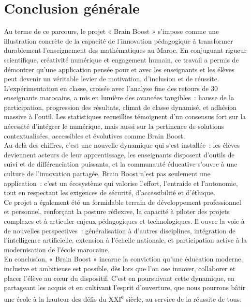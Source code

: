 \documentclass[a4paper,11pt]{report}
\begin{document}
\chapter*{Conclusion générale}

Au terme de ce parcours, le projet « Brain Boost » s'impose comme une illustration concrète de la capacité de l'innovation pédagogique à transformer durablement l'enseignement des mathématiques au Maroc. En conjuguant rigueur scientifique, créativité numérique et engagement humain, ce travail a permis de démontrer qu'une application pensée pour et avec les enseignants et les élèves peut devenir un véritable levier de motivation, d'inclusion et de réussite.\\
L'expérimentation en classe, croisée avec l'analyse fine des retours de 30 enseignants marocains, a mis en lumière des avancées tangibles : hausse de la participation, progression des résultats, climat de classe dynamisé, et adhésion massive à l'outil. Les statistiques recueillies témoignent d'un consensus fort sur la nécessité d'intégrer le numérique, mais aussi sur la pertinence de solutions contextualisées, accessibles et évolutives comme Brain Boost.\\
Au-delà des chiffres, c'est une nouvelle dynamique qui s'est installée : les élèves deviennent acteurs de leur apprentissage, les enseignants disposent d'outils de suivi et de différenciation puissants, et la communauté éducative s'ouvre à une culture de l'innovation partagée. Brain Boost n'est pas seulement une application : c'est un écosystème qui valorise l'effort, l'entraide et l'autonomie, tout en respectant les exigences de sécurité, d'accessibilité et d'éthique.\\
Ce projet a également été un formidable terrain de développement professionnel et personnel, renforçant la posture réflexive, la capacité à piloter des projets complexes et à articuler enjeux pédagogiques et technologiques. Il ouvre la voie à de nouvelles perspectives : généralisation à d'autres disciplines, intégration de l'intelligence artificielle, extension à l'échelle nationale, et participation active à la modernisation de l'école marocaine.\\
En conclusion, « Brain Boost » incarne la conviction qu'une éducation moderne, inclusive et ambitieuse est possible, dès lors que l'on ose innover, collaborer et placer l'élève au cœur du dispositif. C'est en poursuivant cette dynamique, en partageant les acquis et en cultivant l'esprit d'ouverture, que nous pourrons bâtir une école à la hauteur des défis du XXI\textsuperscript{e} siècle, au service de la réussite de tous.
\end{document}
